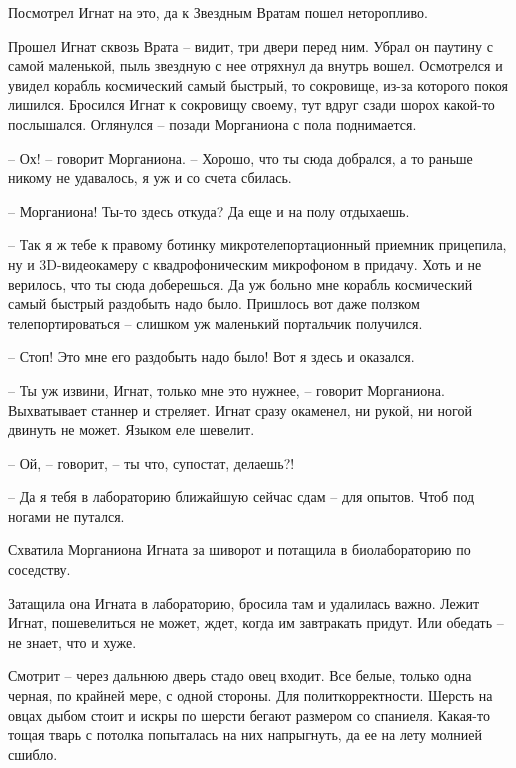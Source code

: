 \documentclass[ebook,oneside,final,openright]{memoir}
\begin{document}
\par
Посмотрел Игнат на это, да к Звездным Вратам пошел неторопливо.\par
\par
\par
Прошел Игнат сквозь Врата – видит, три двери перед ним. Убрал он паутину с самой маленькой, пыль звездную с нее отряхнул да внутрь вошел. Осмотрелся и увидел корабль космический самый быстрый, то сокровище, из-за которого покоя лишился. Бросился Игнат к сокровищу своему, тут вдруг сзади шорох какой-то послышался. Оглянулся – позади Морганиона с пола поднимается.\par
– Ох! – говорит Морганиона. – Хорошо, что ты сюда добрался, а то раньше никому не удавалось, я уж и со счета сбилась.\par
– Морганиона! Ты-то здесь откуда? Да еще и на полу отдыхаешь.\par
– Так я ж тебе к правому ботинку микротелепортационный приемник прицепила, ну и 3D-видеокамеру с квадрофоническим микрофоном в придачу. Хоть и не верилось, что ты сюда доберешься. Да уж больно мне корабль космический самый быстрый раздобыть надо было. Пришлось вот даже ползком телепортироваться – слишком уж маленький портальчик получился.\par
– Стоп! Это мне его раздобыть надо было! Вот я здесь и оказался.\par
– Ты уж извини, Игнат, только мне это нужнее, – говорит Морганиона. Выхватывает станнер и стреляет. Игнат сразу окаменел, ни рукой, ни ногой двинуть не может. Языком еле шевелит.\par
– Ой, – говорит, – ты что, супостат, делаешь?!\par
– Да я тебя в лабораторию ближайшую сейчас сдам – для опытов. Чтоб под ногами не путался.\par
Схватила Морганиона Игната за шиворот и потащила в биолабораторию по соседству.\par
\par
Затащила она Игната в лабораторию, бросила там и удалилась важно. Лежит Игнат, пошевелиться не может, ждет, когда им завтракать придут. Или обедать – не знает, что и хуже. \par
Смотрит – через дальнюю дверь стадо овец входит. Все белые, только одна черная, по крайней мере, с одной стороны. Для политкорректности. Шерсть на овцах дыбом стоит и искры по шерсти бегают размером со спаниеля. Какая-то тощая тварь с потолка попыталась на них напрыгнуть, да ее на лету молнией сшибло.\par
\par
\end{document}

